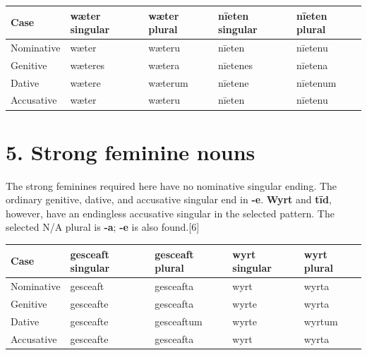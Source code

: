 \par\begingroup
\fontsize{10.5}{13.2}\selectfont
\setlength{\LTleft}{0pt}\setlength{\LTright}{\fill}
\noindent
\begin{tabular}{@{}>{\raggedright\arraybackslash}p{22.0mm}>{\raggedright\arraybackslash}p{22.688mm}>{\raggedright\arraybackslash}p{22.688mm}>{\raggedright\arraybackslash}p{22.688mm}>{\raggedright\arraybackslash}p{22.688mm}@{}}
\toprule
\textbf{Case} & \textbf{wæter singular} & \textbf{wæter plural} & \textbf{nīeten singular} & \textbf{nīeten plural} \\
\midrule
Nominative & wæter & wæteru & nīeten & nīetenu \\
Genitive & wæteres & wætera & nīetenes & nīetena \\
Dative & wætere & wæterum & nīetene & nīetenum \\
Accusative & wæter & wæteru & nīeten & nīetenu \\
\bottomrule
\end{tabular}
\par\endgroup

\section*{5. Strong feminine nouns}

The strong feminines required here have no nominative singular ending. The ordinary genitive, dative, and accusative singular end in \textbf{-e}. \textbf{Wyrt} and \textbf{tīd}, however, have an endingless accusative singular in the selected pattern. The selected N/\allowbreak{}A plural is \textbf{-a}; \textbf{-e} is also found.[6]

\par\begingroup
\fontsize{10.5}{13.2}\selectfont
\setlength{\LTleft}{0pt}\setlength{\LTright}{\fill}
\noindent
\begin{tabular}{@{}>{\raggedright\arraybackslash}p{22.0mm}>{\raggedright\arraybackslash}p{22.688mm}>{\raggedright\arraybackslash}p{22.688mm}>{\raggedright\arraybackslash}p{22.688mm}>{\raggedright\arraybackslash}p{22.688mm}@{}}
\toprule
\textbf{Case} & \textbf{gesceaft singular} & \textbf{gesceaft plural} & \textbf{wyrt singular} & \textbf{wyrt plural} \\
\midrule
Nominative & gesceaft & gesceafta & wyrt & wyrta \\
Genitive & gesceafte & gesceafta & wyrte & wyrta \\
Dative & gesceafte & gesceaftum & wyrte & wyrtum \\
Accusative & gesceafte & gesceafta & wyrt & wyrta \\
\bottomrule
\end{tabular}
\par\endgroup

